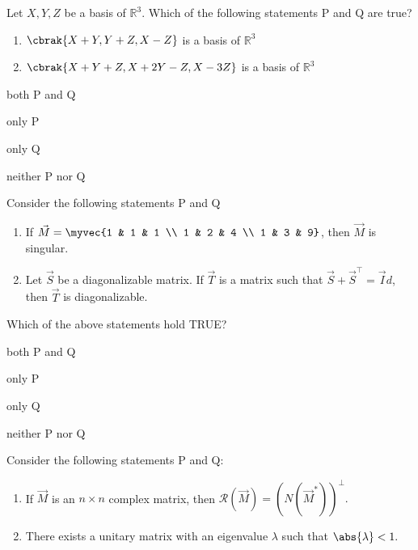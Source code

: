 \item Let ${X, Y, Z}$ be a basis of $\mathbb{R}^3.$ Which of the following statements P and Q are true?
\hfill{}
		\begin{enumerate}[label=\Alph*:, start=16]
			\item  $\cbrak{X + Y, Y + Z, X - Z}$ is a basis of  $\mathbb{R}^3$
			\item  $\cbrak{X + Y + Z, X + 2Y - Z, X - 3Z}$ is a basis of  $\mathbb{R}^3$
\end{enumerate}
\begin{enumerate}
\begin{multicols}{4}
\item both P and Q
\item only P
\item only Q
\item neither P nor Q
\end{multicols}
\end{enumerate}
\item Consider the following statements P and Q
		\begin{enumerate}[label=\Alph*:, start=16]
\item   If $\vec{M} = \myvec{1 & 1 & 1 \\ 1 & 2 & 4 \\ 1 & 3 & 9}$, then $\vec{M}$ is singular.
\item  Let $\vec{S}$ be a diagonalizable matrix. If $\vec{T}$ is a matrix such that $\vec{S} + \vec{S}^{\top} = \vec{I}d$, then $\vec{T}$ is diagonalizable.
\end{enumerate}
Which of the above statements hold TRUE?
\hfill{}
\begin{enumerate}
\begin{multicols}{4}
\item both P and Q
\item only P
\item only Q
\item neither P nor Q
\end{multicols}
\end{enumerate}
\item Consider the following statements P and Q:
		\begin{enumerate}[label=\Alph*:, start=16]
\item  If $\vec{M}$ is an $n \times n$ complex matrix, then $\mathcal{R}(\vec{M}) = (N(\vec{M}^*))^\perp.$
\item  There exists a unitary matrix with an eigenvalue $\lambda$ such that $\abs{\lambda} < 1.$
\end{enumerate}
